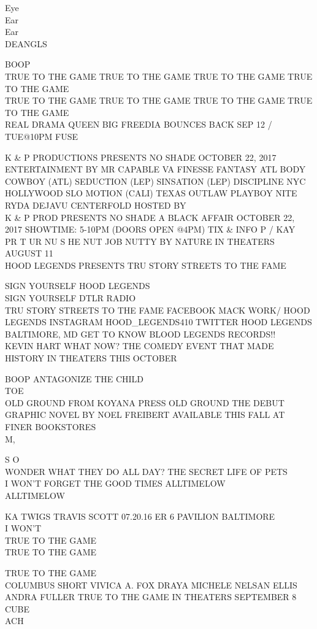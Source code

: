 \documentclass[10pt,letterpaper]{article}
\begin{document}
Eye\\
Ear\\
Ear\\
DEANGLS

BOOP\\
TRUE TO THE GAME TRUE TO THE GAME TRUE TO THE GAME TRUE TO THE GAME\\
TRUE TO THE GAME TRUE TO THE GAME TRUE TO THE GAME TRUE TO THE GAME\\
REAL DRAMA QUEEN BIG FREEDIA BOUNCES BACK SEP 12 / TUE@10PM FUSE

K \& P PRODUCTIONS PRESENTS NO SHADE OCTOBER 22, 2017 ENTERTAINMENT BY MR CAPABLE VA FINESSE FANTASY ATL BODY COWBOY (ATL) SEDUCTION (LEP) SINSATION (LEP) DISCIPLINE NYC HOLLYWOOD SLO MOTION (CALI) TEXAS OUTLAW PLAYBOY NITE RYDA DEJAVU CENTERFOLD HOSTED BY\\
K \& P PROD PRESENTS NO SHADE A BLACK AFFAIR OCTOBER 22, 2017 SHOWTIME: 5{-}10PM (DOORS OPEN @4PM) TIX \& INFO P / KAY\\
PR T UR NU S HE NUT JOB NUTTY BY NATURE IN THEATERS AUGUST 11\\
HOOD LEGENDS PRESENTS TRU STORY STREETS TO THE FAME

SIGN YOURSELF HOOD LEGENDS\\
SIGN YOURSELF DTLR RADIO\\
TRU STORY STREETS TO THE FAME FACEBOOK MACK WORK/ HOOD LEGENDS INSTAGRAM HOOD\_LEGENDS410 TWITTER HOOD LEGENDS BALTIMORE, MD GET TO KNOW BLOOD LEGENDS RECORDS!!\\
KEVIN HART WHAT NOW?  THE COMEDY EVENT THAT MADE HISTORY IN THEATERS THIS OCTOBER

BOOP ANTAGONIZE THE CHILD\\
TOE\\
OLD GROUND FROM KOYANA PRESS OLD GROUND THE DEBUT GRAPHIC NOVEL BY NOEL FREIBERT AVAILABLE THIS FALL AT FINER BOOKSTORES\\
M,

S O\\
WONDER WHAT THEY DO ALL DAY?  THE SECRET LIFE OF PETS\\
I WON'T FORGET THE GOOD TIMES ALLTIMELOW\\
ALLTIMELOW

KA TWIGS TRAVIS SCOTT 07.20.16 ER 6 PAVILION BALTIMORE\\
I WON'T\\
TRUE TO THE GAME\\
TRUE TO THE GAME

TRUE TO THE GAME\\
COLUMBUS SHORT VIVICA A. FOX DRAYA MICHELE NELSAN ELLIS ANDRA FULLER TRUE TO THE GAME IN THEATERS SEPTEMBER 8\\
CUBE\\
ACH
\end{document}
